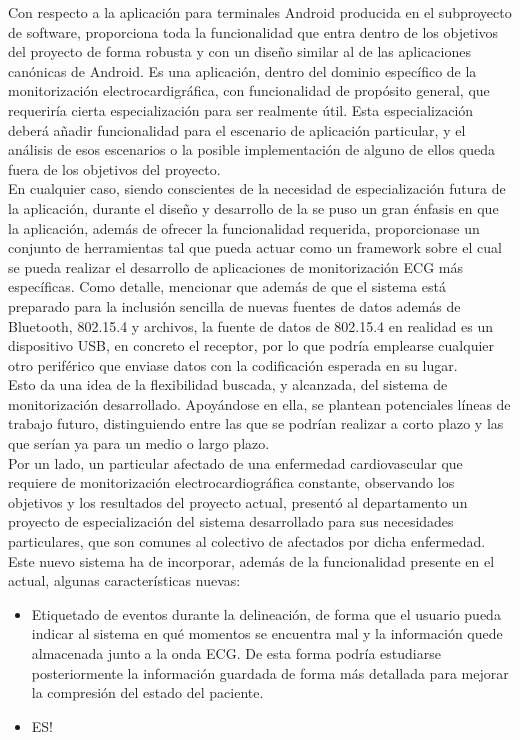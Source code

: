 	Con respecto a la aplicación para terminales Android producida en el subproyecto de software, proporciona toda la funcionalidad que entra dentro de los objetivos del proyecto de forma robusta y con un diseño similar al de las aplicaciones canónicas de Android. Es una aplicación, dentro del dominio específico de la monitorización electrocardigráfica, con funcionalidad de propósito general, que requeriría cierta especialización para ser realmente útil. Esta especialización deberá añadir funcionalidad para el escenario de aplicación particular, y el análisis de esos escenarios o la posible implementación de alguno de ellos queda fuera de los objetivos del proyecto.\\

	En cualquier caso, siendo conscientes de la necesidad de especialización futura de la aplicación, durante el diseño y desarrollo de la se puso un gran énfasis en que la aplicación, además de ofrecer la funcionalidad requerida, proporcionase un conjunto de herramientas tal que pueda actuar como un framework sobre el cual se pueda realizar el desarrollo de aplicaciones de monitorización ECG más específicas. Como detalle, mencionar que además de que el sistema está preparado para la inclusión sencilla de nuevas fuentes de datos además de Bluetooth, 802.15.4 y archivos, la fuente de datos de 802.15.4 en realidad es un dispositivo USB, en concreto el receptor, por lo que podría emplearse cualquier otro periférico que enviase datos con la codificación esperada en su lugar.\\

	Esto da una idea de la flexibilidad buscada, y alcanzada, del sistema de monitorización desarrollado. Apoyándose en ella, se plantean potenciales líneas de trabajo futuro, distinguiendo entre las que se podrían realizar a corto plazo y las que serían ya para un medio o largo plazo.\\

	Por un lado, un particular afectado de una enfermedad cardiovascular que requiere de monitorización electrocardiográfica constante, observando los objetivos y los resultados del proyecto actual, presentó al departamento un proyecto de especialización del sistema desarrollado para sus necesidades particulares, que son comunes al colectivo de afectados por dicha enfermedad. Este nuevo sistema ha de incorporar, además de la funcionalidad presente en el actual, algunas características nuevas:
	\begin{itemize}
		\item Etiquetado de eventos durante la delineación, de forma que el usuario pueda indicar al sistema en qué momentos se encuentra mal y la información quede almacenada junto a la onda ECG. De esta forma podría estudiarse posteriormente la información guardada de forma más detallada para mejorar la compresión del estado del paciente.
		\item ES!
	\end{itemize}

	